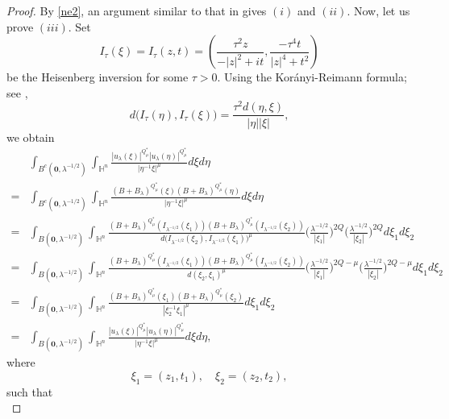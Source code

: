 \documentclass[11pt]{article}
\begin{document}
\begin{proof}
By \eqref{ne2}, an argument similar to that in \cite[Proposition~3.1]{K25} gives $(i)$ and $(ii)$. Now, let us prove $(iii)$. Set
\begin{equation*}
 I_{\tau}(\xi)=I_{\tau}(z,t)=\left(\frac{\tau^2z}{-|z|^2+it},\frac{-\tau^4t}{|z|^4+t^2}\right)
\end{equation*}
be the Heisenberg inversion for some $\tau>0$. Using the Kor\'{a}nyi-Reimann formula; see \cite{P16},
\begin{equation*}
 d\big(I_{\tau}(\eta),I_{\tau}(\xi)\big)=\frac{\tau^2 d(\eta,\xi)}{|\eta||\xi|},
\end{equation*}
we obtain
\begin{align*}
 &\int_{B^c(\mathbf{0},\lambda^{-1/2})}\int_{\mathbb{H}^{n}}\frac{|u_\lambda(\xi)|^{Q^{\ast}_{\mu}}|u_\lambda(\eta)|
^{Q^{\ast}_{\mu}}}{|\eta^{-1}\xi|^{\mu}}{d}\xi{d}\eta\\
=&
\int_{B^c(\mathbf{0},\lambda^{-1/2})}\int_{\mathbb{H}^{n}}\frac{(B+B_\lambda)^{Q^{\ast}_{\mu}}(\xi)(B+B_\lambda)
^{Q^{\ast}_{\mu}}(\eta)}{|\eta^{-1}\xi|^{\mu}}{d}\xi{d}\eta\\
=&\int_{B(\mathbf{0},\lambda^{-1/2})}\int_{\mathbb{H}^{n}}\frac{(B+B_\lambda)^{Q^{\ast}_{\mu}}(I_{\lambda^{-1/2}}(\xi_1))(B+B_\lambda)
^{Q^{\ast}_{\mu}}(I_{\lambda^{-1/2}}(\xi_2))}{d\big(I_{\lambda^{-1/2}}(\xi_2),I_{\lambda^{-1/2}}(\xi_1)\big)^{\mu}}
\bigg(\frac{\lambda^{-1/2}}{|\xi_1|}\bigg)^{2Q}\bigg(\frac{\lambda^{-1/2}}{|\xi_2|}\bigg)^{2Q}{d}\xi_1{d}\xi_2\\
=&\int_{B(\mathbf{0},\lambda^{-1/2})}\int_{\mathbb{H}^{n}}\frac{(B+B_\lambda)^{Q^{\ast}_{\mu}}(I_{\lambda^{-1/2}}(\xi_1))(B+B_\lambda)
^{Q^{\ast}_{\mu}}(I_{\lambda^{-1/2}}(\xi_2))}{d(\xi_2,\xi_1)^{\mu}}
\bigg(\frac{\lambda^{-1/2}}{|\xi_1|}\bigg)^{2Q-\mu}\bigg(\frac{\lambda^{-1/2}}{|\xi_2|}\bigg)^{2Q-\mu}{d}\xi_1{d}\xi_2\\
=&\int_{B(\mathbf{0},\lambda^{-1/2})}\int_{\mathbb{H}^{n}}\frac{(B+B_\lambda)^{Q^{\ast}_{\mu}}(\xi_1)(B+B_\lambda)
^{Q^{\ast}_{\mu}}(\xi_2)}{|\xi_2^{-1}\xi_1|^{\mu}}{d}\xi_1{d}\xi_2\\
=&\int_{B(\mathbf{0},\lambda^{-1/2})}\int_{\mathbb{H}^{n}}\frac{|u_\lambda(\xi)|^{Q^{\ast}_{\mu}}|u_\lambda(\eta)|
^{Q^{\ast}_{\mu}}}{|\eta^{-1}\xi|^{\mu}}{d}\xi{d}\eta,
\end{align*}
where
\begin{equation*}
 \xi_1=(z_1,t_1),\quad \xi_2=(z_2,t_2),
\end{equation*}
such that
\begin{equation*}

\end{equation*}
\end{proof}
\end{document}
